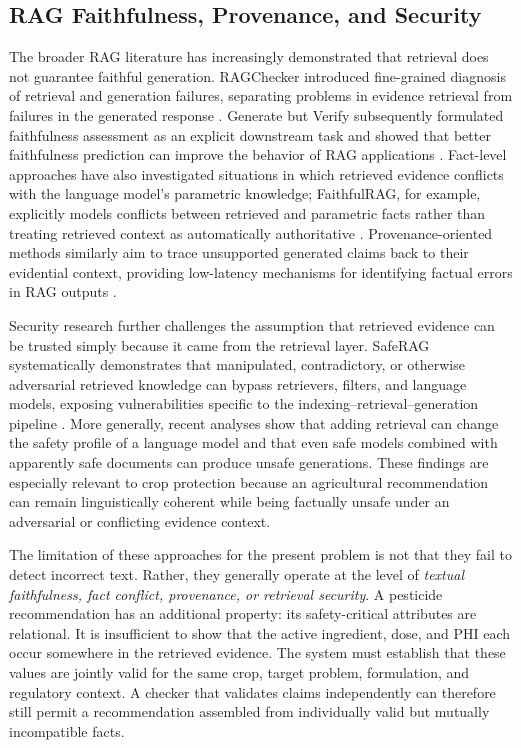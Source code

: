 \documentclass[a4paper,fleqn]{cas-dc}
\begin{document}
\subsection{RAG Faithfulness, Provenance, and Security}
The broader RAG literature has increasingly demonstrated that retrieval does not guarantee faithful generation. RAGChecker introduced fine-grained diagnosis of retrieval and generation failures, separating problems in evidence retrieval from failures in the generated response \citep{ragchecker2024}. Generate but Verify subsequently formulated faithfulness assessment as an explicit downstream task and showed that better faithfulness prediction can improve the behavior of RAG applications \citep{generateverify2025}. Fact-level approaches have also investigated situations in which retrieved evidence conflicts with the language model's parametric knowledge; FaithfulRAG, for example, explicitly models conflicts between retrieved and parametric facts rather than treating retrieved context as automatically authoritative \citep{faithfulrag2025}. Provenance-oriented methods similarly aim to trace unsupported generated claims back to their evidential context, providing low-latency mechanisms for identifying factual errors in RAG outputs \citep{scifact2020}.

Security research further challenges the assumption that retrieved evidence can be trusted simply because it came from the retrieval layer. SafeRAG systematically demonstrates that manipulated, contradictory, or otherwise adversarial retrieved knowledge can bypass retrievers, filters, and language models, exposing vulnerabilities specific to the indexing--retrieval--generation pipeline \citep{saferag2025}. More generally, recent analyses show that adding retrieval can change the safety profile of a language model and that even safe models combined with apparently safe documents can produce unsafe generations. These findings are especially relevant to crop protection because an agricultural recommendation can remain linguistically coherent while being factually unsafe under an adversarial or conflicting evidence context.

The limitation of these approaches for the present problem is not that they fail to detect incorrect text. Rather, they generally operate at the level of \emph{textual faithfulness, fact conflict, provenance, or retrieval security}. A pesticide recommendation has an additional property: its safety-critical attributes are relational. It is insufficient to show that the active ingredient, dose, and PHI each occur somewhere in the retrieved evidence. The system must establish that these values are jointly valid for the same crop, target problem, formulation, and regulatory context. A checker that validates claims independently can therefore still permit a recommendation assembled from individually valid but mutually incompatible facts.
\end{document}
